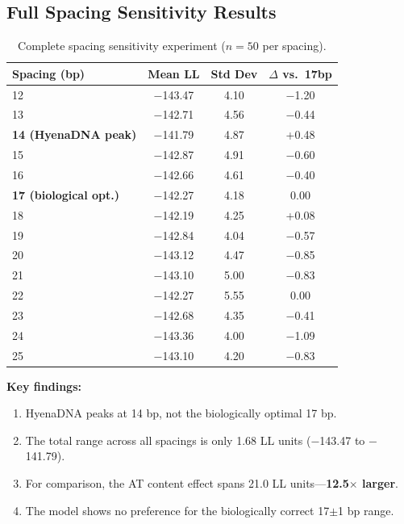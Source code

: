 \documentclass{article}
\begin{document}
\subsection{Full Spacing Sensitivity Results}

\begin{table}[H]
\caption{Complete spacing sensitivity experiment ($n=50$ per spacing).}
\label{tab:full_spacing}
\begin{center}
\small
\begin{tabular}{lccc}
\toprule
Spacing (bp) & Mean LL & Std Dev & $\Delta$ vs.\ 17bp \\
\midrule
12 & $-$143.47 & 4.10 & $-$1.20 \\
13 & $-$142.71 & 4.56 & $-$0.44 \\
\textbf{14 (HyenaDNA peak)} & $-$141.79 & 4.87 & +0.48 \\
15 & $-$142.87 & 4.91 & $-$0.60 \\
16 & $-$142.66 & 4.61 & $-$0.40 \\
\textbf{17 (biological opt.)} & $-$142.27 & 4.18 & 0.00 \\
18 & $-$142.19 & 4.25 & +0.08 \\
19 & $-$142.84 & 4.04 & $-$0.57 \\
20 & $-$143.12 & 4.47 & $-$0.85 \\
21 & $-$143.10 & 5.00 & $-$0.83 \\
22 & $-$142.27 & 5.55 & 0.00 \\
23 & $-$142.68 & 4.35 & $-$0.41 \\
24 & $-$143.36 & 4.00 & $-$1.09 \\
25 & $-$143.10 & 4.20 & $-$0.83 \\
\bottomrule
\end{tabular}
\end{center}
\end{table}

\textbf{Key findings:}
\begin{enumerate}
\item HyenaDNA peaks at 14 bp, not the biologically optimal 17 bp.
\item The total range across all spacings is only 1.68 LL units ($-$143.47 to $-$141.79).
\item For comparison, the AT content effect spans 21.0 LL units---\textbf{12.5$\times$ larger}.
\item The model shows no preference for the biologically correct 17$\pm$1 bp range.
\end{enumerate}
\end{document}
